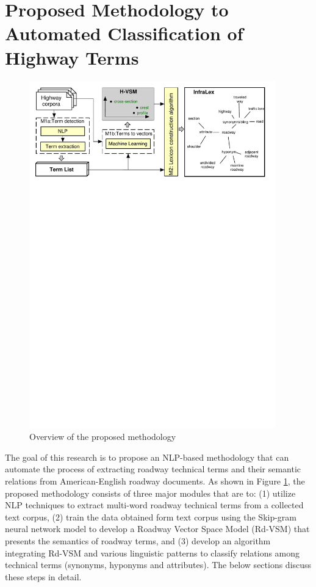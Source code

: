 \documentclass[Journal, BackFigs,NoLists, DoubleSpace]{ascelike}%
\begin{document}
\section{Proposed Methodology to Automated Classification of Highway Terms} \label{sec:RoadLex}
\begin{figure}[t]
	\centering
	\includegraphics[width=0.95\textwidth]{Figure1_overview_methodology}
	\caption{Overview of the proposed methodology}
	\label{fig:framework}
\end{figure}
%
The goal of this research is to propose an NLP-based methodology that can automate the process of extracting roadway technical terms and their semantic relations from American-English roadway documents. As shown in Figure \ref{fig:framework}, the proposed methodology consists of three major modules that are to: (1) utilize NLP techniques to extract multi-word roadway technical terms from a collected text corpus, (2) train the data obtained form text corpus using the Skip-gram neural network model \cite{mikolov13a} to develop a Roadway Vector Space Model (Rd-VSM) that presents the semantics of roadway terms, and (3) develop an algorithm integrating Rd-VSM and various linguistic patterns to classify relations among technical terms (synonyms, hyponyms and attributes). The below sections discuss these steps in detail.
\end{document}
